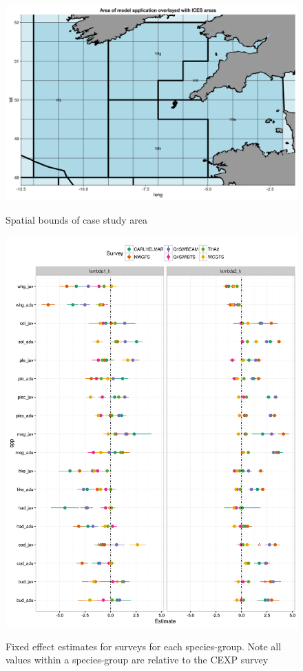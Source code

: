 \documentclass{article}
\begin{document}
\begin{figure}[!ht]
\begin{center}
	\includegraphics[width = 0.9\linewidth]{"figures/AreaMap"}
	\label{fig:S9}
	\caption{Spatial bounds of case study area}
	\end{center}
\end{figure}




\begin{figure}[!ht]
\begin{center}
	\includegraphics[width = 0.9\linewidth]{"figures/Suppl - QEstimatesALL"}
	\label{fig:S10}
	\caption{Fixed effect estimates for surveys for each species-group. Note
	all values within a species-group are relative to the CEXP survey}
	\end{center}
\end{figure}
\end{document}
